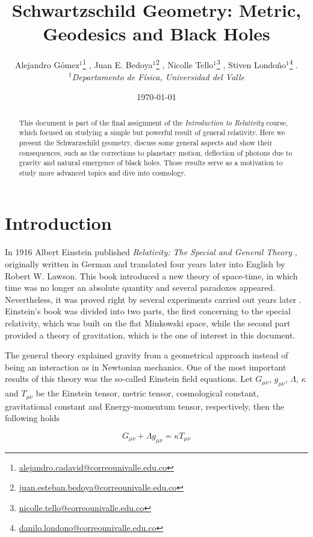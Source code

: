 \documentclass[letterpaper,11pt,onecolumn]{article}
\title{Schwartzschild Geometry: Metric, Geodesics and Black Holes}
\author{ Alejandro Gómez$^1$\thanks{\href{mailto:alejandro.cadavid@correounivalle.edu.co}{alejandro.cadavid@correounivalle.edu.co}} , Juan E. Bedoya$^1$\thanks{\href{mailto:juan.esteban.bedoya@correounivalle.edu.co}{juan.esteban.bedoya@correounivalle.edu.co}} , Nicolle Tello$^1$\thanks{\href{mailto:nicolle.tello@correounivalle.edu.co}{nicolle.tello@correounivalle.edu.co}} , Stiven Londoño$^1$\thanks{\href{mailto:danilo.londono@correounivalle.edu.co}{danilo.londono@correounivalle.edu.co}} . \\ $^1$\textit{Departamento de Física, Universidad del Valle} }
\date{\today}
\begin{document}
\maketitle

\begin{abstract}
    This document is part of the final assignment of the \textit{Introduction to Relativity} course, which focused on studying a simple but powerful result of general relativity. Here we present the Schwarzschild geometry, discuss some general aspects and show their consequences, such as the corrections to planetary motion, deflection of photons due to gravity and natural emergence of black holes. Those results serve as a motivation to study more advanced topics and dive into cosmology. 
    
\end{abstract}

\tableofcontents

\newpage


\section{Introduction}\label{intro}

In 1916 Albert Einstein published \emph{Relativity: The Special and General Theory} \cite{einstein_uber_2009}, originally written in German and translated four years later into English by Robert W. Lawson. This book introduced a new theory of space-time, in which time was no longer an absolute quantity and several paradoxes appeared. Nevertheless, it was proved right by several experiments carried out years later \cite{hobson_efstathiou_lasenby_2006}. Einstein's book was divided into two parts, the first concerning to the special relativity, which was built on the flat Minkowski space, while the second part provided a theory of gravitation, which is the one of interest in this document. 

The general theory explained gravity from a geometrical approach instead of being an interaction as in Newtonian mechanics. One of the most important results of this theory was the so-called Einstein field equations. Let $G_{\mu \nu}$, $ g_{\mu \nu}$, $\Lambda$, $\kappa$ and $T_{\mu \nu}$ be the Einstein tensor, metric tensor, cosmological constant, gravitational constant and Energy-momentum tensor, respectively, then the following holds

\begin{equation} \label{field}
    G_{\mu \nu} + \Lambda g_{\mu \nu} = \kappa T_{\mu \nu} 
\end{equation}
\end{document}
